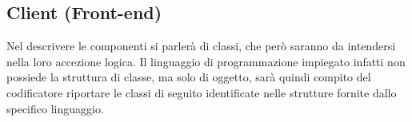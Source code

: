 %


\subsection{Client (Front-end)} %
\label{sub:client}
Nel descrivere le componenti si parlerà di classi, che però saranno da intendersi nella loro accezione logica. Il linguaggio di programmazione impiegato infatti non possiede la struttura di classe, ma solo di oggetto, sarà quindi compito del codificatore riportare le classi di seguito identificate nelle strutture fornite dallo specifico linguaggio.

